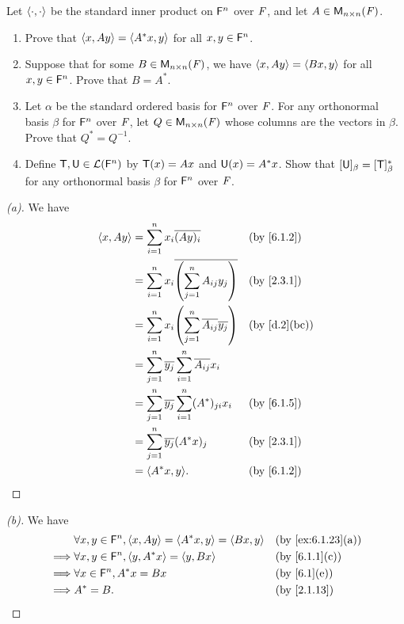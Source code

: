 \begin{ex}\label{ex:6.1.23}
	Let \(\left\langle\cdot, \cdot\right\rangle\) be the standard inner product on \(\mathsf{F}^n\) over \(\mathit{F}\), and let \(A \in \ms[n][n][\F]\).
	\begin{enumerate}
		\item Prove that \(\left\langle x, Ay\right\rangle = \left\langle A^* x, y\right\rangle\) for all \(x, y \in \mathsf{F}^n\).
		\item Suppose that for some \(B \in \ms[n][n][\F]\), we have \(\left\langle x, Ay\right\rangle = \left\langle Bx, y\right\rangle\) for all \(x, y \in \mathsf{F}^n\).
		      Prove that \(B = A^*\).
		\item Let \(\alpha\) be the standard ordered basis for \(\mathsf{F}^n\) over \(\mathit{F}\).
		      For any orthonormal basis \(\beta\) for \(\mathsf{F}^n\) over \(\mathit{F}\), let \(Q \in \ms[n][n][\F]\) whose columns are the vectors in \(\beta\).
		      Prove that \(Q^* = Q^{-1}\).
		\item Define \(\mathsf{T}, \mathsf{U} \in \mathcal{L}(\mathsf{F}^n)\) by \(\mathsf{T}(x) = Ax\) and \(\mathsf{U}(x) = A^* x\).
		      Show that \([\mathsf{U}]_{\beta} = [\mathsf{T}]_{\beta}^*\) for any orthonormal basis \(\beta\) for \(\mathsf{F}^n\) over \(\mathit{F}\).
	\end{enumerate}
\end{ex}

\begin{proof}[(a)]
	We have
	\begin{align*}
		\inn{x, Ay} & = \sum_{i = 1}^n x_i \conj{(Ay)_i}                                 &  & \by{6.1.2}   \\
		            & = \sum_{i = 1}^n x_i \conj{\pa{\sum_{j = 1}^n A_{i j} y_j}}        &  & \by{2.3.1}   \\
		            & = \sum_{i = 1}^n x_i \pa{\sum_{j = 1}^n \conj{A_{i j}} \conj{y_j}} &  & \by{d.2}[bc] \\
		            & = \sum_{j = 1}^n \conj{y_j} \sum_{i = 1}^n \conj{A_{i j}} x_i                        \\
		            & = \sum_{j = 1}^n \conj{y_j} \sum_{i = 1}^n (A^*)_{j i} x_i         &  & \by{6.1.5}   \\
		            & = \sum_{j = 1}^n \conj{y_j} (A^* x)_j                              &  & \by{2.3.1}   \\
		            & = \inn{A^* x, y}.                                                  &  & \by{6.1.2}
	\end{align*}
\end{proof}

\begin{proof}[(b)]
	We have
	\begin{align*}
		         & \forall x, y \in \vs{F}^n, \inn{x, Ay} = \inn{A^* x, y} = \inn{Bx, y} &  & \by{ex:6.1.23}[a] \\
		\implies & \forall x, y \in \vs{F}^n, \inn{y, A^* x} = \inn{y, Bx}               &  & \by{6.1.1}[c]     \\
		\implies & \forall x \in \vs{F}^n, A^* x = Bx                                    &  & \by{6.1}[e]       \\
		\implies & A^* = B.                                                              &  & \by{2.1.13}
	\end{align*}
\end{proof}

